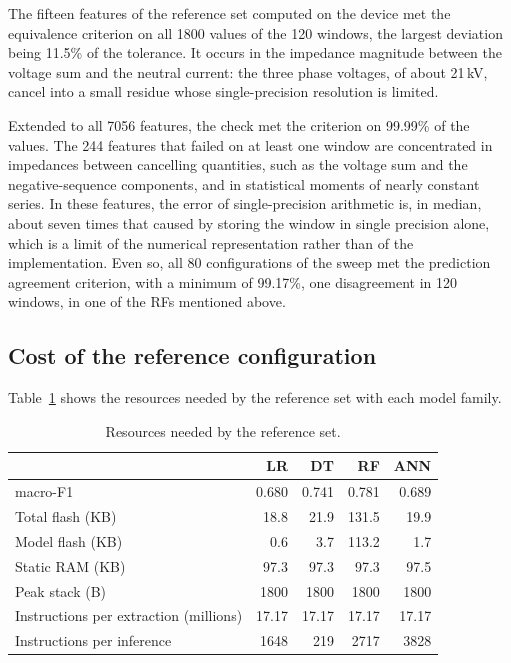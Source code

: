 \documentclass[11pt,a4paper]{article}
\newcommand{\note}[1]{\par\vspace{0.3em}{\footnotesize\raggedright #1\par}}
\begin{document}
The fifteen features of the reference set computed on the device met the equivalence criterion on all 1800 values of the 120 windows, the largest deviation being 11.5\% of the tolerance. It occurs in the impedance magnitude between the voltage sum and the neutral current: the three phase voltages, of about 21\,kV, cancel into a small residue whose single-precision resolution is limited.

Extended to all 7056 features, the check met the criterion on 99.99\% of the values. The 244 features that failed on at least one window are concentrated in impedances between cancelling quantities, such as the voltage sum and the negative-sequence components, and in statistical moments of nearly constant series. In these features, the error of single-precision arithmetic is, in median, about seven times that caused by storing the window in single precision alone, which is a limit of the numerical representation rather than of the implementation. Even so, all 80 configurations of the sweep met the prediction agreement criterion, with a minimum of 99.17\%, one disagreement in 120 windows, in one of the RFs mentioned above.

\subsection{Cost of the reference configuration}
Table~\ref{tab:reference} shows the resources needed by the reference set with each model family.

\begin{table}[htb]
  \centering
  \caption{Resources needed by the reference set.}
  \label{tab:reference}
  \begin{tabular}{lrrrr}
  \toprule
  & \textbf{LR} & \textbf{DT} & \textbf{RF} & \textbf{ANN} \\
  \midrule
  macro-F1 & 0.680 & 0.741 & 0.781 & 0.689 \\
  Total flash (KB) & 18.8 & 21.9 & 131.5 & 19.9 \\
  Model flash (KB) & 0.6 & 3.7 & 113.2 & 1.7 \\
  Static RAM (KB) & 97.3 & 97.3 & 97.3 & 97.5 \\
  Peak stack (B) & 1800 & 1800 & 1800 & 1800 \\
  Instructions per extraction (millions) & 17.17 & 17.17 & 17.17 & 17.17 \\
  Instructions per inference & 1648 & 219 & 2717 & 3828 \\
  \bottomrule
  \end{tabular}
  \note{macro-F1 on the 1645 test simulations.}
\end{table}
\end{document}
